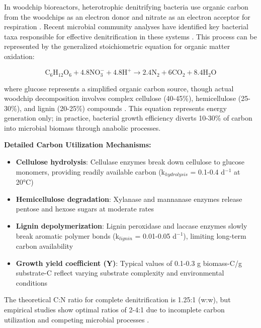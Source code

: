 \documentclass[12pt,a4paper]{article}
\begin{document}
In woodchip bioreactors, heterotrophic denitrifying bacteria use organic carbon from the woodchips as an electron donor and nitrate as an electron acceptor for respiration \citep{RN242, RN725}. Recent microbial community analyses have identified key bacterial taxa responsible for effective denitrification in these systems \citep{RN239, RN1185}. This process can be represented by the generalized stoichiometric equation for organic matter oxidation:

\begin{equation}
\text{C}_6\text{H}_{12}\text{O}_6 + 4.8\text{NO}_{3}^{-} + 4.8\text{H}^{+} \rightarrow 2.4\text{N}_{2} + 6\text{CO}_{2} + 8.4\text{H}_{2}\text{O}
\end{equation}

where glucose represents a simplified organic carbon source, though actual woodchip decomposition involves complex cellulose (40-45\%), hemicellulose (25-30\%), and lignin (20-25\%) compounds \citep{RN725}. This equation represents energy generation only; in practice, bacterial growth efficiency diverts 10-30\% of carbon into microbial biomass through anabolic processes.

\textbf{Detailed Carbon Utilization Mechanisms:}
\begin{itemize}
\item \textbf{Cellulose hydrolysis}: Cellulase enzymes break down cellulose to glucose monomers, providing readily available carbon (k$_{hydrolysis}$ = 0.1-0.4 d$^{-1}$ at 20°C) \citep{RN625, RN242}
\item \textbf{Hemicellulose degradation}: Xylanase and mannanase enzymes release pentose and hexose sugars at moderate rates \citep{RN625}
\item \textbf{Lignin depolymerization}: Lignin peroxidase and laccase enzymes slowly break aromatic polymer bonds (k$_{lignin}$ = 0.01-0.05 d$^{-1}$), limiting long-term carbon availability \citep{RN629}
\item \textbf{Growth yield coefficient (Y)}: Typical values of 0.1-0.3 g biomass-C/g substrate-C reflect varying substrate complexity and environmental conditions
\end{itemize}

The theoretical C:N ratio for complete denitrification is 1.25:1 (w:w), but empirical studies show optimal ratios of 2-4:1 due to incomplete carbon utilization and competing microbial processes \citep{RN725}.
\end{document}
